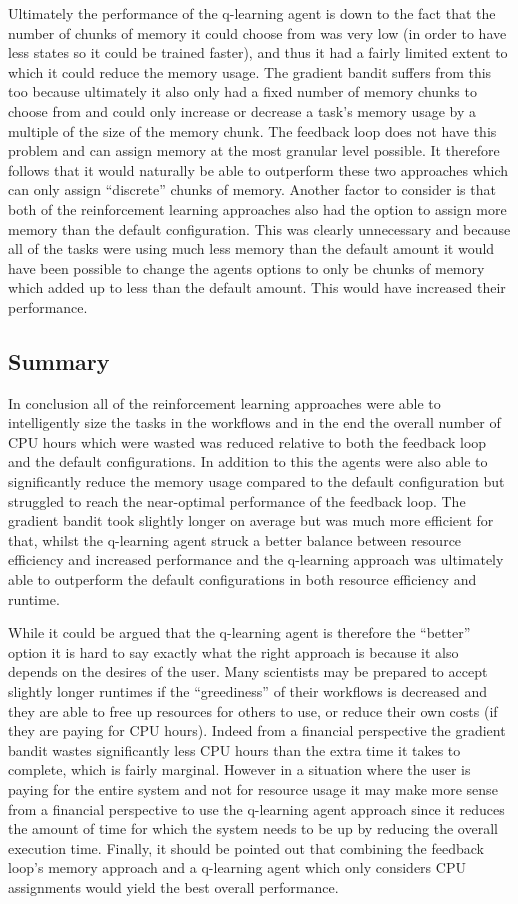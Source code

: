 Ultimately the performance of the q-learning agent is down to the fact that the number of chunks of memory it could choose from was very low (in order to have less states so it could be trained faster), and thus it had a fairly limited extent to which it could reduce the memory usage. The gradient bandit suffers from this too because ultimately it also only had a fixed number of memory chunks to choose from and could only increase or decrease a task’s memory usage by a multiple of the size of the memory chunk. The feedback loop does not have this problem and can assign memory at the most granular level possible. It therefore follows that it would naturally be able to outperform these two approaches which can only assign “discrete” chunks of memory. Another factor to consider is that both of the reinforcement learning approaches also had the option to assign more memory than the default configuration. This was clearly unnecessary and because all of the tasks were using much less memory than the default amount it would have been possible to change the agents options to only be chunks of memory which added up to less than the default amount. This would have increased their performance. 


\subsection{Summary}
\label{sub:summary}

In conclusion all of the reinforcement learning approaches were able to intelligently size the tasks in the workflows and in the end the overall number of CPU hours which were wasted was reduced relative to both the feedback loop and the default configurations. In addition to this the agents were also able to significantly reduce the memory usage compared to the default configuration but struggled to reach the near-optimal performance of the feedback loop. The gradient bandit took slightly longer on average but was much more efficient for that, whilst the q-learning agent struck a better balance between resource efficiency and increased performance and the q-learning approach was ultimately able to outperform the default configurations in both resource efficiency and runtime.

While it could be argued that the q-learning agent is therefore the “better” option it is hard to say exactly what the right approach is because it also depends on the desires of the user. Many scientists may be prepared to accept slightly longer runtimes if the “greediness” of their workflows is decreased and they are able to free up resources for others to use, or reduce their own costs (if they are paying for CPU hours). Indeed from a financial perspective the gradient bandit wastes significantly less CPU hours than the extra time it takes to complete, which is fairly marginal. However in a situation where the user is paying for the entire system and not for resource usage it may make more sense from a financial perspective to use the q-learning agent approach since it reduces the amount of time for which the system needs to be up by reducing the overall execution time. Finally, it should be pointed out that combining the feedback loop’s memory approach and a q-learning agent which only considers CPU assignments would yield the best overall performance.
